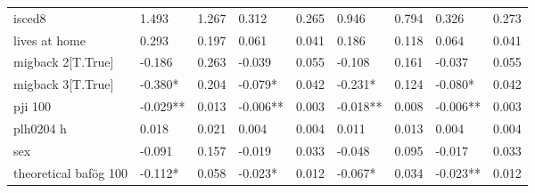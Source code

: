\begin{table}
\begin{tabular}{lllllllll}
isced8                  & 1.493     & 1.267     & 0.312      & 0.265      & 0.946     & 0.794      & 0.326      & 0.273     \\
lives at home           & 0.293     & 0.197     & 0.061      & 0.041      & 0.186     & 0.118      & 0.064      & 0.041     \\
migback 2[T.True]       & -0.186    & 0.263     & -0.039     & 0.055      & -0.108    & 0.161      & -0.037     & 0.055     \\
migback 3[T.True]       & -0.380*   & 0.204     & -0.079*    & 0.042      & -0.231*   & 0.124      & -0.080*    & 0.042     \\
pji 100                 & -0.029**  & 0.013     & -0.006**   & 0.003      & -0.018**  & 0.008      & -0.006**   & 0.003     \\
plh0204 h               & 0.018     & 0.021     & 0.004      & 0.004      & 0.011     & 0.013      & 0.004      & 0.004     \\
sex                     & -0.091    & 0.157     & -0.019     & 0.033      & -0.048    & 0.095      & -0.017     & 0.033     \\
theoretical bafög 100   & -0.112*   & 0.058     & -0.023*    & 0.012      & -0.067*   & 0.034      & -0.023**   & 0.012     \\
\bottomrule
\end{tabular}
\end{table}






